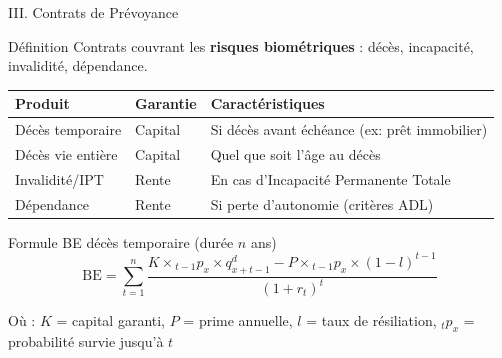 \documentclass[10pt,aspectratio=169]{beamer}
\newcommand{\highlight}[1]{\textbf{\color{rougeactu}#1}}
\newcommand{\BE}{\text{BE}}
\begin{document}
\begin{frame}{III. Contrats de Prévoyance}
\begin{block}{Définition}
Contrats couvrant les \highlight{risques biométriques} : décès, incapacité, invalidité, dépendance.
\end{block}

\begin{table}
\centering
\small
\begin{tabular}{llp{6cm}}
\toprule
\textbf{Produit} & \textbf{Garantie} & \textbf{Caractéristiques} \\
\midrule
\rowcolor{bleuactu!10}
Décès temporaire & Capital & Si décès avant échéance (ex: prêt immobilier) \\
Décès vie entière & Capital & Quel que soit l'âge au décès \\
\rowcolor{bleuactu!10}
Invalidité/IPT & Rente & En cas d'Incapacité Permanente Totale \\
Dépendance & Rente & Si perte d'autonomie (critères ADL) \\
\bottomrule
\end{tabular}
\end{table}

\vspace{0.3cm}
\begin{exampleblock}{Formule BE décès temporaire (durée $n$ ans)}
\[
\boxed{\BE = \sum_{t=1}^{n} \frac{K \times {}_{t-1}p_x \times q_{x+t-1}^d - P \times {}_{t-1}p_x \times (1-l)^{t-1}}{(1+r_t)^t}}
\]

Où : $K$ = capital garanti, $P$ = prime annuelle, $l$ = taux de résiliation, ${}_{t}p_x$ = probabilité survie jusqu'à $t$
\end{exampleblock}
\end{frame}
\end{document}
